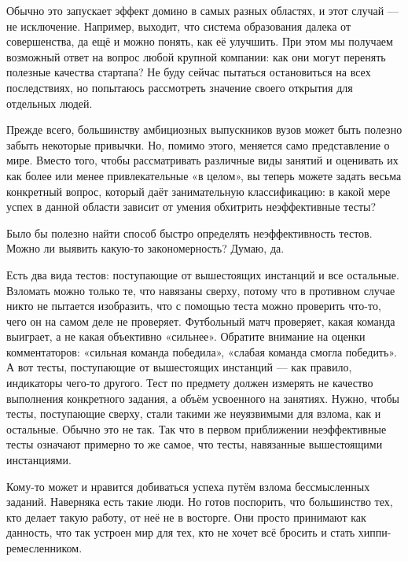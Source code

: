 \documentclass[ebook,12pt,oneside,openany]{memoir}
\begin{document}
Обычно это запускает эффект домино в самых разных областях, и этот
случай — не исключение. Например, выходит, что система образования
далека от совершенства, да ещё и можно понять, как её улучшить. При
этом мы получаем возможный ответ на вопрос любой крупной компании: как
они могут перенять полезные качества стартапа? Не буду сейчас пытаться
остановиться на всех последствиях, но попытаюсь рассмотреть значение
своего открытия для отдельных людей. \newline

Прежде всего, большинству амбициозных выпускников вузов может быть
полезно забыть некоторые привычки. Но, помимо этого, меняется само
представление о мире. Вместо того, чтобы рассматривать различные виды
занятий и оценивать их как более или менее привлекательные «в целом»,
вы теперь можете задать весьма конкретный вопрос, который даёт
занимательную классификацию: в какой мере успех в данной области
зависит от умения обхитрить неэффективные тесты? \newline

Было бы полезно найти способ быстро определять неэффективность тестов.
Можно ли выявить какую-то закономерность? Думаю, да. \newline

Есть два вида тестов: поступающие от вышестоящих инстанций и все
остальные. Взломать можно только те, что навязаны сверху, потому что в
противном случае никто не пытается изобразить, что с помощью теста
можно проверить что-то, чего он на самом деле не проверяет. Футбольный
матч проверяет, какая команда выиграет, а не какая объективно
«сильнее». Обратите внимание на оценки комментаторов: «сильная команда
победила», «слабая команда смогла победить». А вот тесты, поступающие
от вышестоящих инстанций — как правило, индикаторы чего-то другого.
Тест по предмету должен измерять не качество выполнения конкретного
задания, а объём усвоенного на занятиях. Нужно, чтобы тесты,
поступающие сверху, стали такими же неуязвимыми для взлома, как и
остальные. Обычно это не так. Так что в первом приближении
неэффективные тесты означают примерно то же самое, что тесты,
навязанные вышестоящими инстанциями. \newline

Кому-то может и нравится добиваться успеха путём взлома бессмысленных
заданий. Наверняка есть такие люди. Но готов поспорить, что
большинство тех, кто делает такую работу, от неё не в восторге. Они
просто принимают как данность, что так устроен мир для тех, кто не
хочет всё бросить и стать хиппи-ремесленником. \newline
\end{document}

